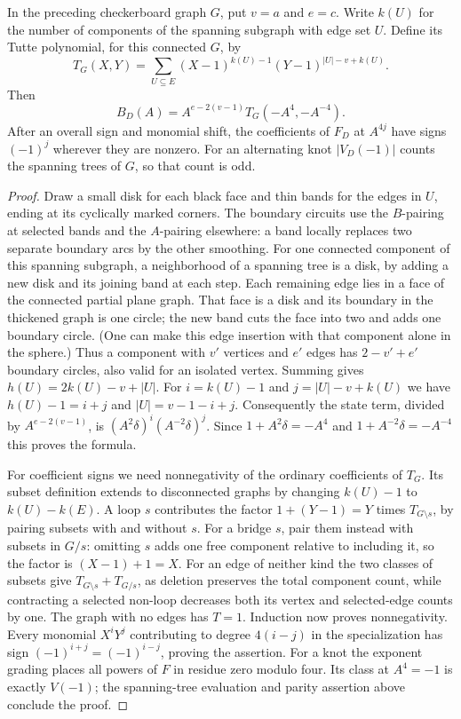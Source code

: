 \begin{proposition}
In the preceding checkerboard graph $G$, put $v=a$ and $e=c$. Write
$k(U)$ for the number of components of the spanning subgraph with edge
set $U$. Define its Tutte polynomial, for this connected $G$, by
\[
 T_G(X,Y)=\sum_{U\subseteq E}
 (X-1)^{k(U)-1}(Y-1)^{|U|-v+k(U)}.
\]
Then
\[
 B_D(A)=A^{e-2(v-1)}T_G(-A^4,-A^{-4}).
\]
After an overall sign and monomial shift, the coefficients of $F_D$ at
$A^{4j}$ have signs $(-1)^j$ wherever they are nonzero.
For an alternating knot $|V_D(-1)|$ counts the spanning trees of $G$,
so that count is odd.
\end{proposition}
\begin{proof}
Draw a small disk for each black face and thin bands for the edges in
$U$, ending at its cyclically marked corners. The boundary circuits use
the $B$-pairing at selected bands and the $A$-pairing elsewhere: a
band locally replaces two separate boundary arcs by the other smoothing.
For one connected component of this spanning subgraph, a neighborhood of
a spanning tree is a disk, by adding a new disk and its joining band at
each step. Each remaining edge lies in a face of the connected partial
plane graph. That face is a disk and its boundary in the thickened graph
is one circle; the new band cuts the face into two and adds one boundary
circle. (One can make this edge insertion with that component alone in
the sphere.) Thus a component with $v'$ vertices and $e'$ edges has
$2-v'+e'$ boundary circles, also valid for an isolated vertex. Summing
gives $h(U)=2k(U)-v+|U|$. For $i=k(U)-1$ and
$j=|U|-v+k(U)$ we have $h(U)-1=i+j$ and $|U|=v-1-i+j$.
Consequently the state term, divided by $A^{e-2(v-1)}$, is
$(A^2\delta)^i(A^{-2}\delta)^j$. Since
$1+A^2\delta=-A^4$ and $1+A^{-2}\delta=-A^{-4}$ this proves the formula.

For coefficient signs we need nonnegativity of the ordinary coefficients
of $T_G$. Its subset definition extends to disconnected graphs by changing
$k(U)-1$ to $k(U)-k(E)$. A loop $s$ contributes the factor
$1+(Y-1)=Y$ times $T_{G\setminus s}$, by pairing subsets with and
without $s$. For a bridge $s$, pair them instead with subsets in $G/s$:
omitting $s$ adds one free component relative to including it, so the
factor is $(X-1)+1=X$. For an edge of neither kind the two classes of
subsets give $T_{G\setminus s}+T_{G/s}$, as deletion preserves the total
component count, while contracting a selected non-loop decreases both
its vertex and selected-edge counts by one. The graph with no edges
has $T=1$. Induction now proves nonnegativity. Every monomial $X^iY^j$
contributing to degree $4(i-j)$ in the specialization has sign
$(-1)^{i+j}=(-1)^{i-j}$, proving the assertion. For a knot the exponent
grading places all powers of $F$ in residue zero modulo four.
Its class at $A^4=-1$ is exactly $V(-1)$; the spanning-tree evaluation
and parity assertion above conclude the proof.
\end{proof}

